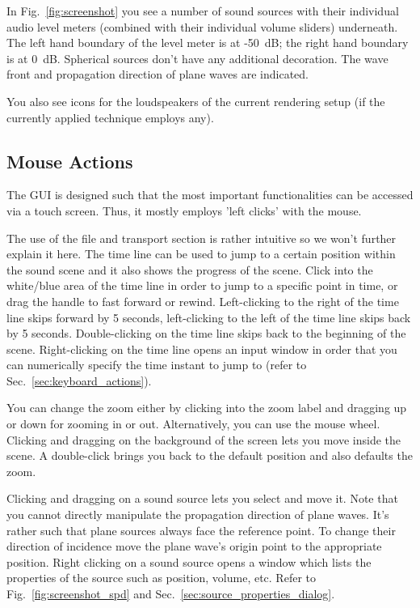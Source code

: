 In Fig.~\ref{fig:screenshot} you see a number of sound sources with their
individual audio level meters (combined with their individual volume
sliders) underneath. The left hand boundary of the level meter is at -50~dB; the right
hand boundary is at 0~dB. Spherical sources don't have any additional
decoration. The wave front and propagation direction of plane waves
are indicated.

You also see icons for the loudspeakers of the current rendering
setup (if the currently applied technique employs any).
%

\subsection{Mouse Actions}
\label{sec:mouse_actions}

The GUI is designed such that the most important functionalities
can be accessed via a touch screen. Thus, it mostly employs 'left
clicks' with the mouse.

The use of the file and transport section is rather intuitive so we
won't further explain it here. The time line can be used to jump to
a certain position within the sound scene and it also shows the
progress of the scene. Click into the white/blue area of the time
line in order to jump to a specific point in time, or drag the
handle to fast forward or rewind. Left-clicking to the right of the
time line skips forward by 5 seconds, left-clicking to the left of
the time line skips back by 5 seconds. Double-clicking on the time
line skips back to the beginning of the scene. Right-clicking on the
time line opens an input window in order that you can numerically
specify the time instant to jump to (refer to
Sec.~\ref{sec:keyboard_actions}).

You can change the zoom either by clicking into the zoom label and
dragging up or down for zooming in or out. Alternatively, you can use the
mouse wheel.
Clicking and dragging on the background of the screen lets you move
inside the scene. A double-click brings you back to the default
position and also defaults the zoom.

Clicking and dragging on a sound source lets you select and move it. Note that
you cannot directly manipulate the propagation direction of plane waves. It's
rather such that plane sources always face the reference point. To change their
direction of incidence move the plane wave's origin point to the appropriate 
position. Right clicking on a sound source opens a window which lists the 
properties of the source such as position, volume, etc. Refer to 
Fig.~\ref{fig:screenshot_spd} and Sec.~\ref{sec:source_properties_dialog}.

